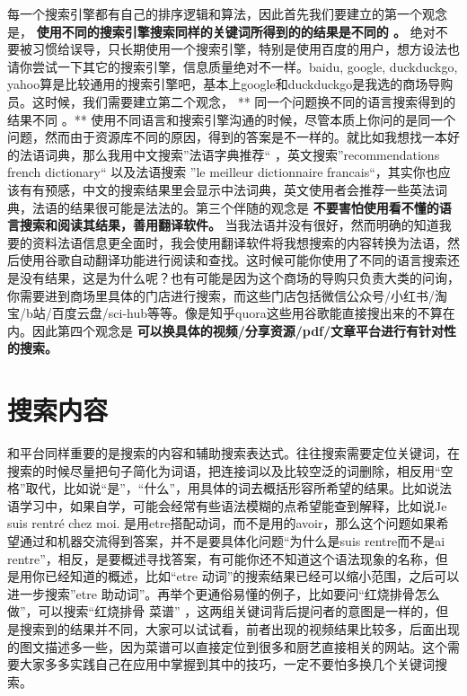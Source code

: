 \documentclass[
]{book}
\begin{document}
每一个搜索引擎都有自己的排序逻辑和算法，因此首先我们要建立的第一个观念是， \textbf{使用不同的搜索引擎搜索同样的关键词所得到的的结果是不同的 。} 绝对不要被习惯给误导，只长期使用一个搜索引擎，特别是使用百度的用户，想方设法也请你尝试一下其它的搜索引擎，信息质量绝对不一样。baidu, google, duckduckgo, yahoo算是比较通用的搜索引擎吧，基本上google和duckduckgo是我选的商场导购员。这时候，我们需要建立第二个观念， ** 同一个问题换不同的语言搜索得到的结果不同 。** 使用不同语言和搜索引擎沟通的时候，尽管本质上你问的是同一个问题，然而由于资源库不同的原因，得到的答案是不一样的。就比如我想找一本好的法语词典，那么我用中文搜索''法语字典推荐`` ，英文搜索''recommendations french dictionary`` 以及法语搜索 ''le meilleur dictionnaire francais``，其实你也应该有有预感，中文的搜索结果里会显示中法词典，英文使用者会推荐一些英法词典，法语的结果很可能是法法的。第三个伴随的观念是 \textbf{不要害怕使用看不懂的语言搜索和阅读其结果，善用翻译软件。} 当我法语并没有很好，然而明确的知道我要的资料法语信息更全面时，我会使用翻译软件将我想搜索的内容转换为法语，然后使用谷歌自动翻译功能进行阅读和查找。这时候可能你使用了不同的语言搜索还是没有结果，这是为什么呢？也有可能是因为这个商场的导购只负责大类的问询，你需要进到商场里具体的门店进行搜索，而这些门店包括微信公众号/小红书/淘宝/b站/百度云盘/sci-hub等等。像是知乎quora这些用谷歌能直接搜出来的不算在内。因此第四个观念是 \textbf{可以换具体的视频/分享资源/pdf/文章平台进行有针对性的搜索。}

\hypertarget{ux641cux7d22ux5185ux5bb9}{%
\section{搜索内容}\label{ux641cux7d22ux5185ux5bb9}}

和平台同样重要的是搜索的内容和辅助搜索表达式。往往搜索需要定位关键词，在搜索的时候尽量把句子简化为词语，把连接词以及比较空泛的词删除，相反用``空格''取代，比如说``是''，``什么''，用具体的词去概括形容所希望的结果。比如说法语学习中，如果自学，可能会经常有些语法模糊的点希望能查到解释，比如说Je suis rentré chez moi. 是用etre搭配动词，而不是用的avoir，那么这个问题如果希望通过和机器交流得到答案，并不是要具体化问题``为什么是suis rentre而不是ai rentre''，相反，是要概述寻找答案，有可能你还不知道这个语法现象的名称，但是用你已经知道的概述，比如``etre 动词''的搜索结果已经可以缩小范围，之后可以进一步搜索''etre 助动词''。再举个更通俗易懂的例子，比如要问``红烧排骨怎么做''，可以搜索``红烧排骨 菜谱'' ，这两组关键词背后提问者的意图是一样的，但是搜索到的结果并不同，大家可以试试看，前者出现的视频结果比较多，后面出现的图文描述多一些，因为菜谱可以直接定位到很多和厨艺直接相关的网站。这个需要大家多多实践自己在应用中掌握到其中的技巧，一定不要怕多换几个关键词搜索。
\end{document}
